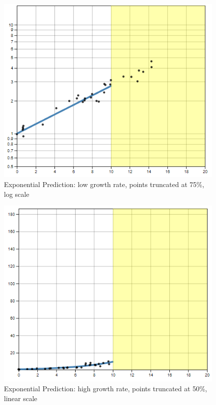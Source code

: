 \documentclass[print]{nuthesis}
\begin{document}
\begin{figure}[tbp]

{\centering \includegraphics[width=0.65\linewidth,]{images/02-you-draw-it/low-15-log} 

}

\caption{Exponential Prediction: low growth rate, points truncated at 75\%, log scale}\label{fig:low-15-log}
\end{figure}

\begin{figure}[tbp]

{\centering \includegraphics[width=0.65\linewidth,]{images/02-you-draw-it/high-10-linear} 

}

\caption{Exponential Prediction: high growth rate, points truncated at 50\%, linear scale}\label{fig:high-10-linear}
\end{figure}
\end{document}
